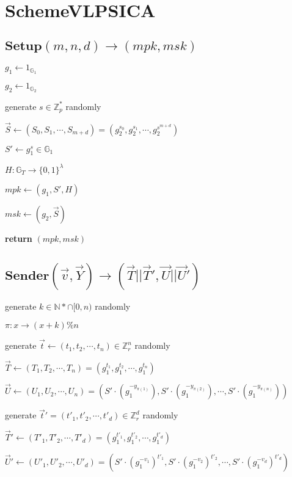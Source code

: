 \documentclass[a4paper]{article}
\begin{document}
\section{SchemeVLPSICA}

\subsection{$\textbf{Setup}(m, n, d) \rightarrow (\textit{mpk}, \textit{msk})$}

$g_1 \gets 1_{\mathbb{G}_1}$

$g_2 \gets 1_{\mathbb{G}_2}$

generate $s \in \mathbb{Z}_p^*$ randomly

$\vec{S} \gets (S_0, S_1, \cdots, S_{m + d}) = (g_2^{s_0}, g_2^{s_1}, \cdots, g_2^{s^{m + d}})$

$S' \gets g_1^s \in \mathbb{G}_1$

$H: \mathbb{G}_T \rightarrow \{0, 1\}^\lambda$

$\textit{mpk} \gets (g_1, S', H)$

$\textit{msk} \gets (g_2, \vec{S})$

\textbf{return} $(\textit{mpk}, \textit{msk})$

\subsection{$\textbf{Sender}(\vec{v}, \vec{Y}) \rightarrow (\vec{T} || \vec{T}', \vec{U} || \vec{U}')$}

generate $k \in \mathbb{N}* \cap [0, n)$ randomly

$\pi: x \rightarrow (x + k) \% n$

generate $\vec{t} \gets (t_1, t_2, \cdots, t_n) \in \mathbb{Z}_r^n$ randomly

$\vec{T} \gets (T_1, T_2, \cdots, T_n) = (g_1^{t_1}, g_1^{t_2}, \cdots, g_1^{t_n})$

$\vec{U} \gets (U_1, U_2, \cdots, U_n) = (S' \cdot (g_1^{-y_{\pi(1)}}), S' \cdot (g_1^{-y_{\pi(2)}}), \cdots, S' \cdot (g_1^{-y_{\pi(n)}}))$

generate $\vec{t}' = (t'_1, t'_2, \cdots, t'_d) \in \mathbb{Z}_r^d$ randomly

$\vec{T}' \gets (T'_1, T'_2, \cdots, T'_d) = (g_1^{t'_1}, g_1^{t'_2}, \cdots, g_1^{t'_d})$

$\vec{U}' \gets (U'_1, U'_2, \cdots, U'_d) = (S' \cdot (g_1^{-v_1})^{t'_1}, S' \cdot (g_1^{-v_2})^{t'_2}, \cdots, S' \cdot (g_1^{-v_d})^{t'_d})$
\end{document}
